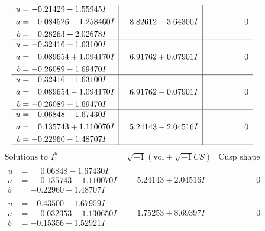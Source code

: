 \documentclass[1p]{elsarticle_modified}
\theoremstyle{definition}
\newcommand{\I}{\sqrt{-1}}
\begin{document}
$$\begin{array}{c|c|c}
\begin{aligned}
u &= -0.21429 - 1.55945 I \\
a &= -0.084526 - 1.258460 I \\
b &= \phantom{-}0.28263 + 2.02678 I\end{aligned}
 & \phantom{-}8.82612 - 3.64300 I & \phantom{-0.000000 } 0 \\ \hline\begin{aligned}
u &= -0.32416 + 1.63100 I \\
a &= \phantom{-}0.089654 + 1.094170 I \\
b &= -0.26089 - 1.69470 I\end{aligned}
 & \phantom{-}6.91762 + 0.07901 I & \phantom{-0.000000 } 0 \\ \hline\begin{aligned}
u &= -0.32416 - 1.63100 I \\
a &= \phantom{-}0.089654 - 1.094170 I \\
b &= -0.26089 + 1.69470 I\end{aligned}
 & \phantom{-}6.91762 - 0.07901 I & \phantom{-0.000000 } 0 \\ \hline\begin{aligned}
u &= \phantom{-}0.06848 + 1.67430 I \\
a &= \phantom{-}0.135743 + 1.110070 I \\
b &= -0.22960 - 1.48707 I\end{aligned}
 & \phantom{-}5.24143 - 2.04516 I & \phantom{-0.000000 } 0\\
 \hline 
 \end{array}$$\newpage$$\begin{array}{c|c|c}  
\text{Solutions to }I^u_{1}& \I (\text{vol} + \sqrt{-1}CS) & \text{Cusp shape}\\
 \hline 
\begin{aligned}
u &= \phantom{-}0.06848 - 1.67430 I \\
a &= \phantom{-}0.135743 - 1.110070 I \\
b &= -0.22960 + 1.48707 I\end{aligned}
 & \phantom{-}5.24143 + 2.04516 I & \phantom{-0.000000 } 0 \\ \hline\begin{aligned}
u &= -0.43500 + 1.67959 I \\
a &= \phantom{-}0.032353 - 1.130650 I \\
b &= -0.15356 + 1.52921 I\end{aligned}
 & \phantom{-}1.75253 + 8.69397 I & \phantom{-0.000000 } 0 \\ \hline\begin{aligned}

\end{aligned}
\end{array}$$
\end{document}
